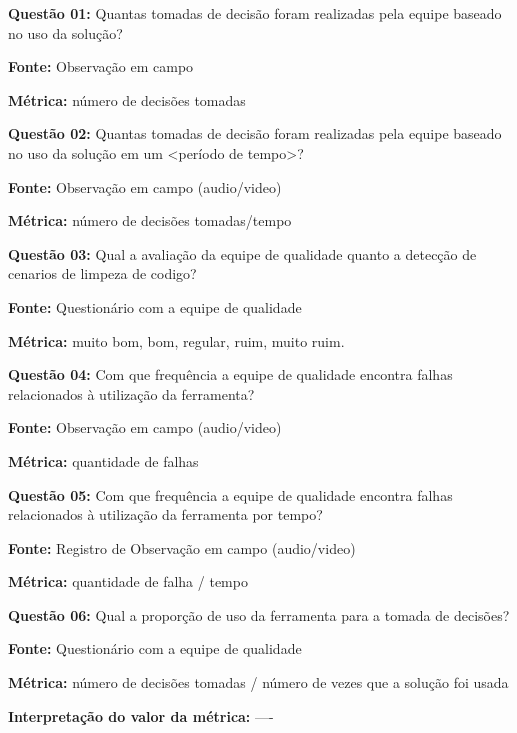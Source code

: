 \textbf{Questão 01:} Quantas tomadas de decisão foram realizadas pela equipe baseado no uso da solução?

\textbf{Fonte:} Observação em campo

\textbf{Métrica:} número de decisões tomadas \newline

\textbf{Questão 02:} Quantas tomadas de decisão foram realizadas pela equipe baseado no uso da solução em um <período de tempo>?

\textbf{Fonte:} Observação em campo (audio/video)

\textbf{Métrica:} número de decisões tomadas/tempo \newline


\textbf{Questão 03:} Qual a avaliação da equipe de qualidade quanto a detecção de cenarios de limpeza de codigo?

\textbf{Fonte:} Questionário com a equipe de qualidade

\textbf{Métrica:} muito bom, bom, regular, ruim, muito ruim. \newline


\textbf{Questão 04:} Com que frequência a equipe de qualidade encontra falhas relacionados à utilização da ferramenta?

\textbf{Fonte:} Observação em campo (audio/video)

\textbf{Métrica:} quantidade de falhas \newline



\textbf{Questão 05:} Com que frequência a equipe de qualidade encontra falhas relacionados à utilização da ferramenta por tempo?

\textbf{Fonte:} Registro de Observação em campo (audio/video)

\textbf{Métrica:} quantidade de falha / tempo \newline



\textbf{Questão 06:} Qual a proporção de uso da ferramenta para a tomada de decisões?

\textbf{Fonte:} Questionário com a equipe de qualidade

\textbf{Métrica:} número de decisões tomadas / número de vezes que a solução foi usada 

\textbf{Interpretação do valor da métrica:} ---- \newline



